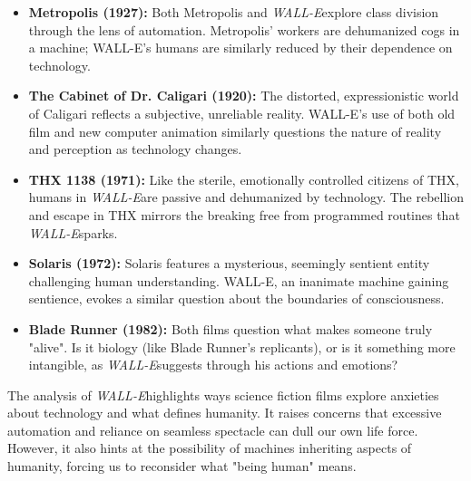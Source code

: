 \documentclass[11pt,fleqn]{book} %
\begin{document}
\begin{itemize}
\item \textbf{Metropolis (1927):} Both Metropolis and \textit{WALL-E}explore class division through the lens of automation. Metropolis' workers are dehumanized cogs in a machine; WALL-E's humans are similarly reduced by their dependence on technology.

\item \textbf{The Cabinet of Dr. Caligari (1920):} The distorted, expressionistic world of Caligari reflects a subjective, unreliable reality. WALL-E's use of both old film and new computer animation similarly questions the nature of reality and perception as technology changes.

\item \textbf{THX 1138 (1971):}  Like the sterile, emotionally controlled citizens of THX, humans in \textit{WALL-E}are passive and dehumanized by technology. The rebellion and escape in THX mirrors the breaking free from programmed routines that \textit{WALL-E}sparks.

\item \textbf{Solaris (1972):} Solaris features a mysterious, seemingly sentient entity challenging human understanding. WALL-E, an inanimate machine gaining sentience, evokes a similar question about the boundaries of consciousness.

\item \textbf{Blade Runner (1982):} Both films question what makes someone truly "alive". Is it biology (like Blade Runner's replicants), or is it something more intangible, as \textit{WALL-E}suggests through his actions and emotions?
\end{itemize}

\vspace{5pt}

The analysis of \textit{WALL-E}highlights ways science fiction films explore anxieties about technology and what defines humanity. It raises concerns that excessive automation and reliance on seamless spectacle can dull our own life force. However, it also hints at the possibility of machines inheriting aspects of humanity, forcing us to reconsider what "being human" means. 
\end{document}
